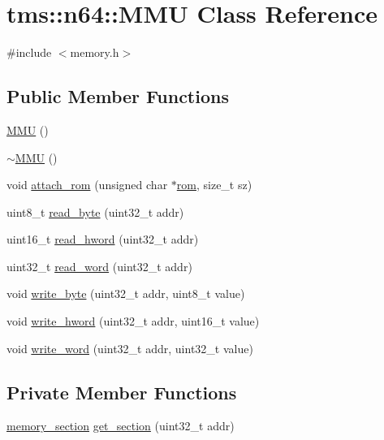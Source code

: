 \hypertarget{classtms_1_1n64_1_1_m_m_u}{}\section{tms\+:\+:n64\+:\+:M\+MU Class Reference}
\label{classtms_1_1n64_1_1_m_m_u}


{\ttfamily \#include $<$memory.\+h$>$}

\subsection*{Public Member Functions}
\begin{DoxyCompactItemize}
\item 
\hyperlink{classtms_1_1n64_1_1_m_m_u_afffbe775b2f0c1611056bea40b6822fc}{M\+MU} ()
\item 
\hyperlink{classtms_1_1n64_1_1_m_m_u_a699238b91cdad78dd343d3c4b321b41a}{$\sim$\+M\+MU} ()
\item 
void \hyperlink{classtms_1_1n64_1_1_m_m_u_a8160b39c9cf0314ba2e3ea96774d8621}{attach\+\_\+rom} (unsigned char $\ast$\hyperlink{classtms_1_1n64_1_1_m_m_u_a9783f6a62389429f9ed792c8b5bffab4}{rom}, size\+\_\+t sz)
\item 
uint8\+\_\+t \hyperlink{classtms_1_1n64_1_1_m_m_u_a087d270b77e9fa8ddba70a1948f8544d}{read\+\_\+byte} (uint32\+\_\+t addr)
\item 
uint16\+\_\+t \hyperlink{classtms_1_1n64_1_1_m_m_u_ad07253ade01ee3c384a4c97de629e6cd}{read\+\_\+hword} (uint32\+\_\+t addr)
\item 
uint32\+\_\+t \hyperlink{classtms_1_1n64_1_1_m_m_u_aa1733381eba7e34e53a6fa61fae6f78b}{read\+\_\+word} (uint32\+\_\+t addr)
\item 
void \hyperlink{classtms_1_1n64_1_1_m_m_u_ab268451a72e963b905e58eb911f8c9c9}{write\+\_\+byte} (uint32\+\_\+t addr, uint8\+\_\+t value)
\item 
void \hyperlink{classtms_1_1n64_1_1_m_m_u_a8ed994a56825ebd365ec9a967e1534ca}{write\+\_\+hword} (uint32\+\_\+t addr, uint16\+\_\+t value)
\item 
void \hyperlink{classtms_1_1n64_1_1_m_m_u_aaeece0cab2e1328124ce0a5c82c418e2}{write\+\_\+word} (uint32\+\_\+t addr, uint32\+\_\+t value)
\end{DoxyCompactItemize}
\subsection*{Private Member Functions}
\begin{DoxyCompactItemize}
\item 
\hyperlink{structtms_1_1n64_1_1memory__section}{memory\+\_\+section} \hyperlink{classtms_1_1n64_1_1_m_m_u_a749568ef68d32ff3fc14ef3bb2bbcb81}{get\+\_\+section} (uint32\+\_\+t addr)
\end{DoxyCompactItemize}
